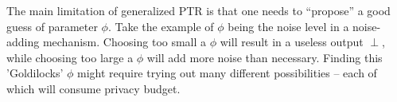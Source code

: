 The main limitation of generalized PTR is that one needs to ``propose'' a good guess of parameter $\phi$.  Take the example of $\phi$ being the noise level in a noise-adding mechanism. Choosing too small a $\phi$ will result in a useless output $\perp$, while choosing too large a $\phi$ will add more noise than necessary. Finding this 'Goldilocks' $\phi$ might require trying out many different possibilities -- each of which will consume privacy budget.


